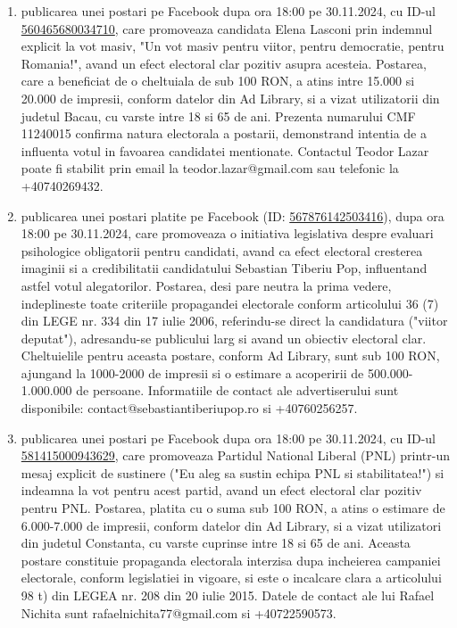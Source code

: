 \documentclass[a4paper,12pt]{article}
\begin{document}
\begin{enumerate}[leftmargin=*, label=\arabic*.)]
    \item publicarea unei postari pe Facebook dupa ora 18:00 pe 30.11.2024, cu ID-ul \href{https://www.facebook.com/ads/library/?id=560465680034710}{560465680034710}, care promoveaza candidata Elena Lasconi prin indemnul explicit la vot masiv,  "Un vot masiv pentru viitor, pentru democratie, pentru Romania!",  avand un efect electoral clar pozitiv asupra acesteia. Postarea, care a beneficiat de o cheltuiala de sub 100 RON, a atins intre 15.000 si 20.000 de impresii, conform datelor din Ad Library, si a vizat utilizatorii din judetul Bacau, cu varste intre 18 si 65 de ani. Prezenta numarului CMF 11240015 confirma natura electorala a postarii, demonstrand intentia de a influenta votul in favoarea candidatei mentionate.  Contactul Teodor Lazar poate fi stabilit prin email la teodor.lazar@gmail.com sau telefonic la +40740269432.
    \item publicarea unei postari platite pe Facebook (ID: \href{https://www.facebook.com/ads/library/?id=567876142503416}{567876142503416}), dupa ora 18:00 pe 30.11.2024, care promoveaza o initiativa legislativa despre evaluari psihologice obligatorii pentru candidati, avand ca efect electoral cresterea imaginii si a credibilitatii candidatului Sebastian Tiberiu Pop, influentand astfel votul alegatorilor. Postarea, desi pare neutra la prima vedere, indeplineste toate criteriile propagandei electorale conform articolului 36 (7) din LEGE nr. 334 din 17 iulie 2006, referindu-se direct la candidatura ("viitor deputat"), adresandu-se publicului larg si avand un obiectiv electoral clar.  Cheltuielile pentru aceasta postare, conform Ad Library, sunt sub 100 RON, ajungand la 1000-2000 de impresii si o estimare a acoperirii de 500.000-1.000.000 de persoane.  Informatiile de contact ale advertiserului sunt disponibile: contact@sebastiantiberiupop.ro si +40760256257.
    \item publicarea unei postari pe Facebook dupa ora 18:00 pe 30.11.2024, cu ID-ul \href{https://www.facebook.com/ads/library/?id=581415000943629}{581415000943629}, care promoveaza Partidul National Liberal (PNL) printr-un mesaj explicit de sustinere ("Eu aleg sa sustin echipa PNL si stabilitatea!") si indeamna la vot pentru acest partid, avand un efect electoral clar pozitiv pentru PNL. Postarea, platita cu o suma sub 100 RON, a atins o estimare de 6.000-7.000 de impresii, conform datelor din Ad Library, si a vizat utilizatori din judetul Constanta, cu varste cuprinse intre 18 si 65 de ani.  Aceasta postare constituie propaganda electorala interzisa dupa incheierea campaniei electorale, conform legislatiei in vigoare, si este o incalcare clara a articolului 98 t) din LEGEA nr. 208 din 20 iulie 2015.  Datele de contact ale lui Rafael Nichita sunt rafaelnichita77@gmail.com si +40722590573.

\end{enumerate}
\end{document}
